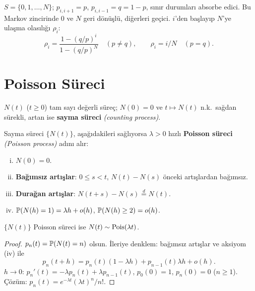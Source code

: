\begin{ornek}\label{ex:gambler_markov}
$S=\{0,1,\ldots,N\}$; $p_{i,i+1}=p$, $p_{i,i-1}=q=1-p$, sınır durumları absorbe edici. Bu Markov zincirinde $0$ ve $N$ geri dönüşlü, diğerleri geçici. $i$'den başlayıp $N$'ye ulaşma olasılığı $\rho_i$:
\[
  \rho_i = \frac{1-(q/p)^i}{1-(q/p)^N} \quad (p\neq q), \qquad \rho_i = i/N \quad (p=q).
\]
\end{ornek}

\section{Poisson Süreci}
\label{sec:poisson_sureci}

\begin{tanim}\label{def:sayma_sureci}
$N(t)$ ($t\geq0$) tam sayı değerli süreç; $N(0)=0$ ve $t\mapsto N(t)$ n.k.\ sağdan sürekli, artan ise \textbf{sayma süreci} \emph{(counting process)}.
\end{tanim}

\begin{tanim}\label{def:poisson_sureci}
Sayma süreci $\{N(t)\}$, aşağıdakileri sağlıyorsa $\lambda>0$ hızlı \textbf{Poisson süreci} \emph{(Poisson process)} adını alır:
\begin{enumerate}[(i)]
  \item $N(0)=0$.
  \item \textbf{Bağımsız artışlar}: $0\leq s<t$, $N(t)-N(s)$ önceki artışlardan bağımsız.
  \item \textbf{Durağan artışlar}: $N(t+s)-N(s) \overset{d}{=} N(t)$.
  \item $\mathbb{P}(N(h)=1)=\lambda h+o(h)$, $\mathbb{P}(N(h)\geq2)=o(h)$.
\end{enumerate}
\end{tanim}

\begin{teorem}\label{thm:poisson_dagilim}
$\{N(t)\}$ Poisson süreci ise $N(t)\sim\operatorname{Pois}(\lambda t)$.
\end{teorem}

\begin{proof}
$p_n(t)=\mathbb{P}(N(t)=n)$ olsun. İleriye denklem: bağımsız artışlar ve aksiyom (iv) ile
\[
  p_n(t+h) = p_n(t)(1-\lambda h) + p_{n-1}(t)\lambda h + o(h).
\]
$h\to0$: $p_n'(t) = -\lambda p_n(t)+\lambda p_{n-1}(t)$, $p_0(0)=1$, $p_n(0)=0$ ($n\geq1$). Çözüm: $p_n(t)=e^{-\lambda t}(\lambda t)^n/n!$.
\end{proof}

